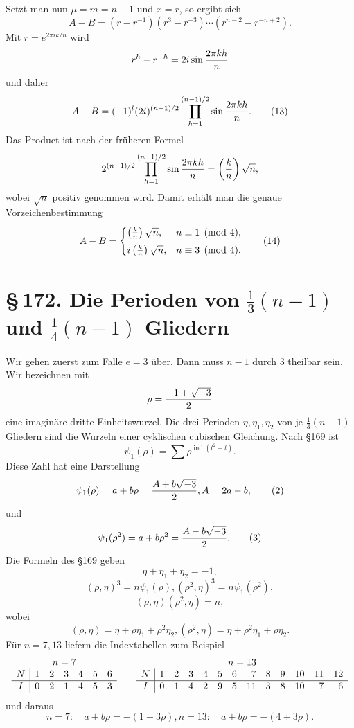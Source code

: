 \documentclass[11pt]{article}
\providecommand{\sect}[2]{\section*{\S\,#1. #2}}
\providecommand{\ind}{\operatorname{ind}}
\begin{document}
Setzt man nun $\mu=m=n-1$ und $x=r$, so ergibt sich
\[
        A-B=(r-r^{-1})(r^3-r^{-3})\cdots(r^{n-2}-r^{-n+2}).              \tag{12}
\]
Mit $r=e^{2\pi i k/n}$ wird
\[
        r^h-r^{-h}=2i\sin {2\pi kh\over n}
\]
und daher
\[
        A-B=(-1)^l(2i)^{(n-1)/2}
        \prod_{h=1}^{(n-1)/2}\sin {2\pi kh\over n}.                    \tag{13}
\]
Das Product ist nach der früheren Formel
\[
        2^{(n-1)/2}
        \prod_{h=1}^{(n-1)/2}\sin {2\pi kh\over n}
        =\left({k\over n}\right)\sqrt n,
\]
wobei $\sqrt n$ positiv genommen wird. Damit erhält man die genaue Vorzeichenbestimmung
\[
        A-B=
        \begin{cases}
        \left({k\over n}\right)\sqrt n,& n\equiv1\pmod 4,\\[0.4em]
        i\left({k\over n}\right)\sqrt n,& n\equiv3\pmod 4.
        \end{cases}                                                    \tag{14}
\]

\sect{172}{Die Perioden von $\frac13(n-1)$ und $\frac14(n-1)$ Gliedern}

Wir gehen zuerst zum Falle $e=3$ über. Dann muss $n-1$ durch $3$ theilbar sein. Wir bezeichnen mit
\[
        \rho={-1+\sqrt{-3}\over2}
\]
eine imaginäre dritte Einheitswurzel. Die drei Perioden $\eta,
\eta_1,
\eta_2$ von je $\frac13(n-1)$ Gliedern sind die Wurzeln einer cyklischen cubischen Gleichung. Nach §169 ist
\[
        \psi_1(\rho)=
        \sum \rho^{\ind(t^2+t)}.                                      \tag{1}
\]
Diese Zahl hat eine Darstellung
\[
        \psi_1(\rho)=a+b\rho={A+b\sqrt{-3}\over2},
        A=2a-b,                                                        \tag{2}
\]
und
\[
        \psi_1(\rho^2)=a+b\rho^2={A-b\sqrt{-3}\over2}.                 \tag{3}
\]
Die Formeln des §169 geben
\[
        \eta+
\eta_1+
\eta_2=-1,                                                           \tag{4}
\]
\[
        (\rho,
\eta)^3=n\psi_1(\rho),
        (\rho^2,
\eta)^3=n\psi_1(\rho^2),                              \tag{5}
\]
\[
        (\rho,
\eta)(\rho^2,
\eta)=n,                                  \tag{6}
\]
wobei
\[
        (\rho,
\eta)=\eta+\rho\eta_1+\rho^2\eta_2,
        (\rho^2,
\eta)=\eta+
\rho^2\eta_1+
\rho\eta_2.                                      \tag{7}
\]
Für $n=7,13$ liefern die Indextabellen zum Beispiel
\[
\begin{array}{c|rrrrrr}
\multicolumn{7}{c}{n=7}\\
N&1&2&3&4&5&6\\ \hline
I&0&2&1&4&5&3
\end{array}
\qquad
\begin{array}{c|rrrrrrrrrrrr}
\multicolumn{13}{c}{n=13}\\
N&1&2&3&4&5&6&7&8&9&10&11&12\\ \hline
I&0&1&4&2&9&5&11&3&8&10&7&6
\end{array}
\]
und daraus
\[
        n=7:
        \quad a+b\rho=-(1+3\rho),
        n=13:
        \quad a+b\rho=-(4+3\rho).
\]
\end{document}
